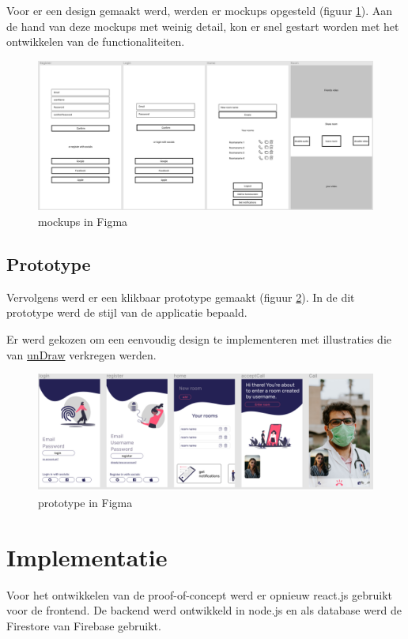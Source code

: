 			Voor er een design gemaakt werd, werden er mockups opgesteld (figuur \ref{fig:mockup}). 
			Aan de hand van deze mockups met weinig detail, kon er snel gestart worden met het ontwikkelen van de functionaliteiten. \autocite{Tate2019}
			\begin{figure}[H]
				\centering
				\includegraphics[width=140mm]{./img/mockup-poc.png}{}
				\caption{mockups in Figma}
				\label{fig:mockup}
			\end{figure}
		
		
		\subsection{Prototype}
		
			Vervolgens werd er een klikbaar prototype gemaakt (figuur \ref{fig:design}). In de dit prototype werd de stijl van de applicatie bepaald.
			
			Er werd gekozen om een eenvoudig design te implementeren met illustraties die van \href{https://undraw.co/}{unDraw} verkregen werden.
			
			\begin{figure}[H]
				\centering
				\includegraphics[width=140mm]{./img/prototype-poc.png}{}
				\caption{prototype in Figma}
				\label{fig:design}
			\end{figure}
			
	
\section{Implementatie}
	Voor het ontwikkelen van de proof-of-concept werd er opnieuw react.js gebruikt voor de frontend. De backend werd ontwikkeld in node.js en als database werd de Firestore van Firebase gebruikt.
	
